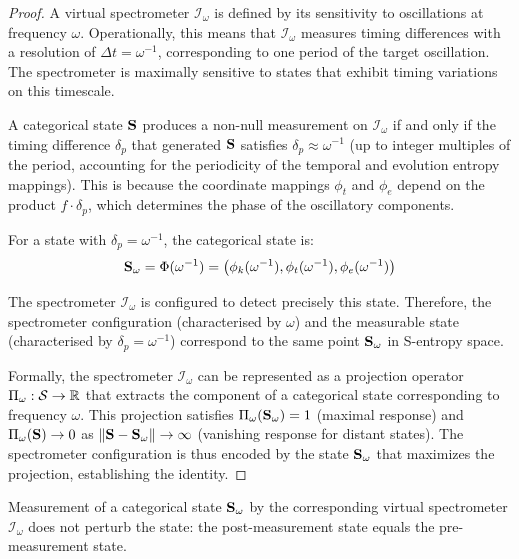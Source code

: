\begin{proof}
A virtual spectrometer $\mathcal{I}_\omega$ is defined by its sensitivity to oscillations at frequency $\omega$. Operationally, this means that $\mathcal{I}_\omega$ measures timing differences with a resolution of $\Delta t = \omega^{-1}$, corresponding to one period of the target oscillation. The spectrometer is maximally sensitive to states that exhibit timing variations on this timescale.

A categorical state $\mathbf{S}$ produces a non-null measurement on $\mathcal{I}_\omega$ if and only if the timing difference $\delta_p$ that generated $\mathbf{S}$ satisfies $\delta_p \approx \omega^{-1}$ (up to integer multiples of the period, accounting for the periodicity of the temporal and evolution entropy mappings). This is because the coordinate mappings $\phi_t$ and $\phi_e$ depend on the product $f \cdot \delta_p$, which determines the phase of the oscillatory components.

For a state with $\delta_p = \omega^{-1}$, the categorical state is:
\begin{equation}
\mathbf{S}_\omega = \Phi(\omega^{-1}) = \left( \phi_k(\omega^{-1}), \phi_t(\omega^{-1}), \phi_e(\omega^{-1}) \right)
\end{equation}

The spectrometer $\mathcal{I}_\omega$ is configured to detect precisely this state. Therefore, the spectrometer configuration (characterised by $\omega$) and the measurable state (characterised by $\delta_p = \omega^{-1}$) correspond to the same point $\mathbf{S}_\omega$ in S-entropy space.

Formally, the spectrometer $\mathcal{I}_\omega$ can be represented as a projection operator $\Pi_\omega: \mathcal{S} \to \mathbb{R}$ that extracts the component of a categorical state corresponding to frequency $\omega$. This projection satisfies $\Pi_\omega(\mathbf{S}_\omega) = 1$ (maximal response) and $\Pi_\omega(\mathbf{S}) \to 0$ as $\|\mathbf{S} - \mathbf{S}_\omega\| \to \infty$ (vanishing response for distant states). The spectrometer configuration is thus encoded by the state $\mathbf{S}_\omega$ that maximizes the projection, establishing the identity.
\end{proof}

\begin{corollary}
\label{cor:zero_backaction}
Measurement of a categorical state $\mathbf{S}_\omega$ by the corresponding virtual spectrometer $\mathcal{I}_\omega$ does not perturb the state: the post-measurement state equals the pre-measurement state.
\end{corollary}

